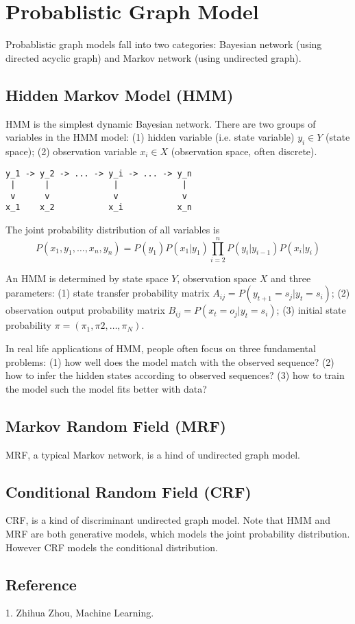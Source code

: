 \section{Probablistic Graph Model}

Probablistic graph models fall into two categories: Bayesian network
(using directed acyclic graph) and Markov network (using undirected
graph).

\subsection{Hidden Markov Model (HMM)}

HMM is the simplest dynamic Bayesian network. There are two groups of variables
in the HMM model: (1) hidden variable (i.e. state variable) $y_i\in Y$ (state
space); (2) observation variable $x_i \in X$ (observation space, often
discrete).

\begin{verbatim}
y_1 -> y_2 -> ... -> y_i -> ... -> y_n
 |      |             |             |
 v      v             v             v
x_1    x_2           x_i           x_n
\end{verbatim}

The joint probability distribution of all variables is
$$ P(x_1,y_1,\ldots,x_n,y_n) = P(y_1)P(x_1|y_1)
\prod_{i=2}^n P(y_i|y_{i-1})P(x_i|y_i) $$

An HMM is determined by state space $Y$, observation space $X$ and three
parameters: (1) state transfer probability matrix $A_{ij} =
P(y_{t+1}=s_j|y_t=s_i)$; (2) observation output probability matrix $B_{ij} =
P(x_t=o_j|y_t=s_i)$; (3) initial state probability $\pi = (\pi_1, \pi2, \ldots,
\pi_N)$.

In real life applications of HMM, people often focus on three fundamental
problems: (1) how well does the model match with the observed sequence?
(2) how to infer the hidden states according to observed sequences?
(3) how to train the model such the model fits better with data?

\subsection{Markov Random Field (MRF)}

MRF, a typical Markov network, is a hind of undirected graph model.

\subsection{Conditional Random Field (CRF)}

CRF, is a kind of discriminant undirected graph model. Note that HMM and MRF
are both generative models, which models the joint probability distribution.
However CRF models the conditional distribution.

\subsection{Reference}

1. Zhihua Zhou, Machine Learning.
